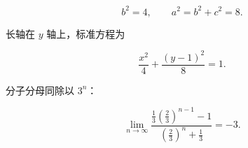 \begin{answer}
\nopagebreak[4]
\[
b^2=4,\qquad a^2=b^2+c^2=8.
\]

长轴在 $y$ 轴上，标准方程为

\nopagebreak[4]
\[
\frac{x^2}{4}+\frac{(y-1)^2}{8}=1.
\]


分子分母同除以 $3^n$：

\nopagebreak[4]
\[
\lim_{n\to\infty}
\frac{\frac13(\frac23)^{n-1}-1}{(\frac23)^n+\frac13}
=-3.
\]






\end{answer}
